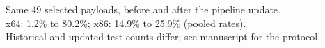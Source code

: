 \documentclass{article}
\begin{document}
\centering

\par\smallskip\small
Same 49 selected payloads, before and after the pipeline update.\\
x64: 1.2\% to 80.2\%; x86: 14.9\% to 25.9\% (pooled rates).\\
Historical and updated test counts differ; see manuscript for the protocol.
\end{document}
